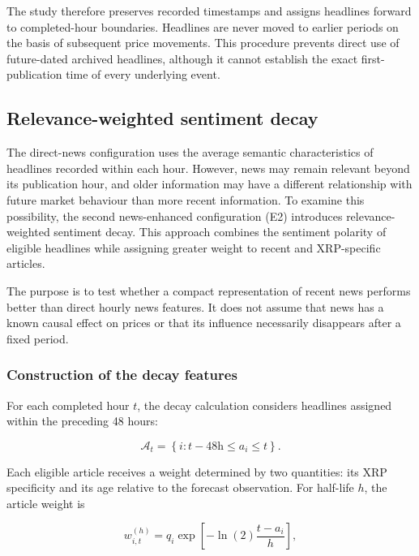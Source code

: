 The study therefore preserves recorded timestamps and assigns headlines forward to completed-hour boundaries. Headlines are never moved to earlier periods on the basis of subsequent price movements. This procedure prevents direct use of future-dated archived headlines, although it cannot establish the exact first-publication time of every underlying event.

\subsection{Relevance-weighted sentiment decay}
\label{sec:method_decay}

The direct-news configuration uses the average semantic characteristics of headlines recorded within each hour. However, news may remain relevant beyond its publication hour, and older information may have a different relationship with future market behaviour than more recent information. To examine this possibility, the second news-enhanced configuration (E2) introduces relevance-weighted sentiment decay. This approach combines the sentiment polarity of eligible headlines while assigning greater weight to recent and XRP-specific articles.

The purpose is to test whether a compact representation of recent news performs better than direct hourly news features. It does not assume that news has a known causal effect on prices or that its influence necessarily disappears after a fixed period.

\subsubsection{Construction of the decay features}

For each completed hour $t$, the decay calculation considers headlines assigned within the preceding 48 hours:

\begin{equation}
\mathcal{A}_t
=
\left\{
i:
t-48\mathrm{h}\leq a_i\leq t
\right\}.
\label{eq:decay_window}
\end{equation}

Each eligible article receives a weight determined by two quantities: its XRP specificity and its age relative to the forecast observation. For half-life $h$, the article weight is

\begin{equation}
w_{i,t}^{(h)}
=
q_i
\exp\left[
-\ln(2)\frac{t-a_i}{h}
\right],
\label{eq:decay_weight}
\end{equation}

